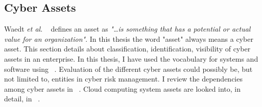 \subsection{Cyber Assets}\label{sec:assets_cyber}
Waedt \textit{et al}. ~\cite{7580812} defines an asset as \textit{"\ldots is something that has a potential or actual value for an organization"}. In this thesis the word "asset" always means a cyber asset. This section details about classification, identification, visibility of cyber assets in an enterprise. In this thesis, I have used the vocabulary for systems and software using ~\cite{5733835}. Evaluation of the different cyber assets could possibly be, but not limited to, entities in cyber risk management. I review the dependencies among cyber assets in ~\cite{6459865}. Cloud computing system assets are looked into, in detail, in ~\cite{7546222}. \\ 
